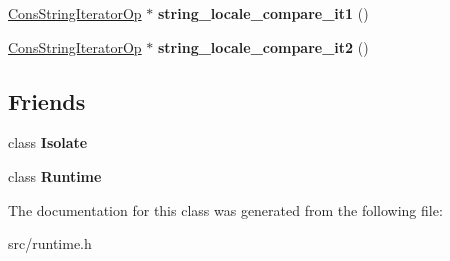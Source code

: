 \begin{DoxyCompactItemize}
\item 
\hypertarget{classv8_1_1internal_1_1_runtime_state_af54b21e8da894dbbc5a09a349afe29e3}{}\hyperlink{classv8_1_1internal_1_1_cons_string_iterator_op}{Cons\+String\+Iterator\+Op} $\ast$ {\bfseries string\+\_\+locale\+\_\+compare\+\_\+it1} ()\label{classv8_1_1internal_1_1_runtime_state_af54b21e8da894dbbc5a09a349afe29e3}

\item 
\hypertarget{classv8_1_1internal_1_1_runtime_state_a20223a12d1ba24ceb19ae5948d66fbeb}{}\hyperlink{classv8_1_1internal_1_1_cons_string_iterator_op}{Cons\+String\+Iterator\+Op} $\ast$ {\bfseries string\+\_\+locale\+\_\+compare\+\_\+it2} ()\label{classv8_1_1internal_1_1_runtime_state_a20223a12d1ba24ceb19ae5948d66fbeb}

\end{DoxyCompactItemize}
\subsection*{Friends}
\begin{DoxyCompactItemize}
\item 
\hypertarget{classv8_1_1internal_1_1_runtime_state_aba4f0964bdacf2bbf62cf876e5d28d0a}{}class {\bfseries Isolate}\label{classv8_1_1internal_1_1_runtime_state_aba4f0964bdacf2bbf62cf876e5d28d0a}

\item 
\hypertarget{classv8_1_1internal_1_1_runtime_state_af3d14e26ba8af9e6cc5a32aad8446de7}{}class {\bfseries Runtime}\label{classv8_1_1internal_1_1_runtime_state_af3d14e26ba8af9e6cc5a32aad8446de7}

\end{DoxyCompactItemize}


The documentation for this class was generated from the following file\+:\begin{DoxyCompactItemize}
\item 
src/runtime.\+h\end{DoxyCompactItemize}
